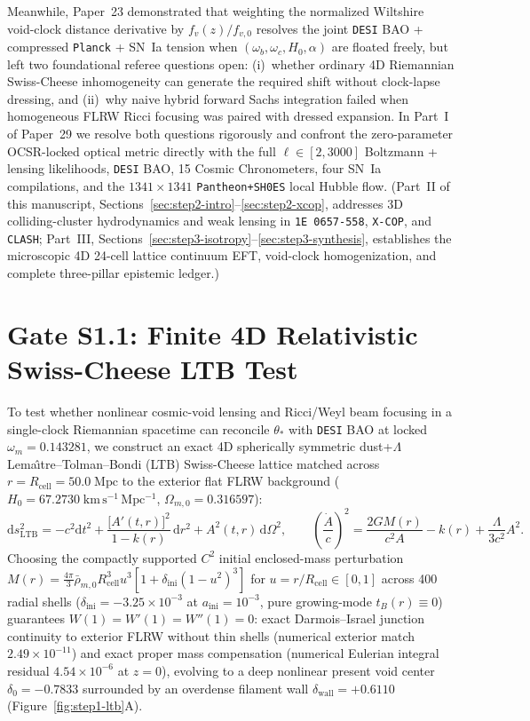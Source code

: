 \documentclass[11pt,a4paper]{article}
\begin{document}
Meanwhile, Paper~23 demonstrated that weighting the normalized Wiltshire void-clock distance derivative by $f_v(z)/f_{v,0}$ resolves the joint \texttt{DESI} BAO + compressed \texttt{Planck} + SN~Ia tension when $(\omega_b, \omega_c, H_0, \alpha)$ are floated freely, but left two foundational referee questions open: (i)~whether ordinary 4D Riemannian Swiss-Cheese inhomogeneity can generate the required shift without clock-lapse dressing, and (ii)~why naive hybrid forward Sachs integration failed when homogeneous FLRW Ricci focusing was paired with dressed expansion. In Part~I of Paper~29 we resolve both questions rigorously and confront the zero-parameter OCSR-locked optical metric directly with the full $\ell \in [2, 3000]$ Boltzmann + lensing likelihoods, \texttt{DESI} BAO, 15 Cosmic Chronometers, four SN~Ia compilations, and the $1341\times 1341$ \texttt{Pantheon+SH0ES} local Hubble flow. (Part~II of this manuscript, Sections~\ref{sec:step2-intro}--\ref{sec:step2-xcop}, addresses 3D colliding-cluster hydrodynamics and weak lensing in \texttt{1E~0657-558}, \texttt{X-COP}, and \texttt{CLASH}; Part~III, Sections~\ref{sec:step3-isotropy}--\ref{sec:step3-synthesis}, establishes the microscopic 4D 24-cell lattice continuum EFT, void-clock homogenization, and complete three-pillar epistemic ledger.)

\section{Gate S1.1: Finite 4D Relativistic Swiss-Cheese LTB Test}
To test whether nonlinear cosmic-void lensing and Ricci/Weyl beam focusing in a single-clock Riemannian spacetime can reconcile $\theta_*$ with \texttt{DESI} BAO at locked $\omega_m = 0.143281$, we construct an exact 4D spherically symmetric dust+$\Lambda$ Lema\^{\i}tre--Tolman--Bondi (LTB) Swiss-Cheese lattice matched across $r = R_{\mathrm{cell}} = 50.0\;\mathrm{Mpc}$ to the exterior flat FLRW background ($H_0 = 67.2730\;\mathrm{km\,s^{-1}\,Mpc^{-1}}$, $\Omega_{m,0} = 0.316597$):
\begin{equation}
    \mathrm{d}s_{\mathrm{LTB}}^2 = -c^2\mathrm{d}t^2 + \frac{\bigl[A'(t,r)\bigr]^2}{1 - k(r)}\,\mathrm{d}r^2 + A^2(t,r)\,\mathrm{d}\Omega^2, \qquad \left(\frac{\dot{A}}{c}\right)^2 = \frac{2GM(r)}{c^2 A} - k(r) + \frac{\Lambda}{3c^2}A^2.
    \label{eq:ltb-metric}
\end{equation}
Choosing the compactly supported $C^2$ initial enclosed-mass perturbation $M(r) = \frac{4\pi}{3}\bar{\rho}_{m,0} R_{\mathrm{cell}}^3 u^3 [1 + \delta_{\mathrm{ini}}(1 - u^2)^3]$ for $u = r/R_{\mathrm{cell}} \in [0, 1]$ across 400 radial shells ($\delta_{\mathrm{ini}} = -3.25\times 10^{-3}$ at $a_{\mathrm{ini}} = 10^{-3}$, pure growing-mode $t_B(r) \equiv 0$) guarantees $W(1) = W'(1) = W''(1) = 0$: exact Darmois--Israel junction continuity to exterior FLRW without thin shells (numerical exterior match $2.49\times 10^{-11}$) and exact proper mass compensation (numerical Eulerian integral residual $4.54\times 10^{-6}$ at $z = 0$), evolving to a deep nonlinear present void center $\delta_0 = -0.7833$ surrounded by an overdense filament wall $\delta_{\mathrm{wall}} = +0.6110$ (Figure~\ref{fig:step1-ltb}A).
\end{document}

